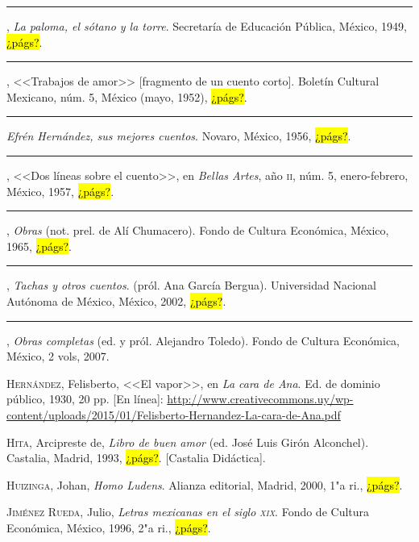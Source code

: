 \documentclass[14pt,twoside,final]{extbook} %
\begin{document}
\rule{1cm}{0.4pt}, \emph{La paloma, el sótano y la torre}. Secretaría de Educación Pública, México, 1949, \hl{¿págs?}.\label{bib:hernandez1949}

\rule{1cm}{0.4pt}, <<Trabajos de amor>> [fragmento de un cuento corto]. Boletín Cultural Mexicano, núm. 5, México (mayo, 1952), \hl{¿págs?}.\label{bib:hernandez1952}

\rule{1cm}{0.4pt} \emph{Efrén Hernández, sus mejores cuentos}. Novaro, México, 1956, \hl{¿págs?}.\label{bib:hernandez1956}

\rule{1cm}{0.4pt}, <<Dos líneas sobre el cuento>>, en \emph{Bellas Artes}, año \textsc{ii}, núm. 5, enero-febrero, México, 1957, \hl{¿págs?}.\label{bib:hernandez1957}

\rule{1cm}{0.4pt}, \emph{Obras} (not. prel. de Alí Chumacero). Fondo de Cultura Económica, México, 1965, \hl{¿págs?}.\label{bib:hernandez1965}

\rule{1cm}{0.4pt}, \emph{Tachas y otros cuentos}. (pról. Ana García Bergua). Universidad Nacional Autónoma de México, México, 2002, \hl{¿págs?}.\label{bib:hernandez2002}

\rule{1cm}{0.4pt}, \emph{Obras completas} (ed. y pról. Alejandro Toledo). Fondo de Cultura Económica, México, 2 vols, 2007.\label{bib:hernandez2007}

\textsc{Hernández}, Felisberto, <<El vapor>>, en \emph{La cara de Ana}. Ed. de dominio público, 1930, 20 pp. [En línea]: \url{http://www.creativecommons.uy/wp-content/uploads/2015/01/Felisberto-Hernandez-La-cara-de-Ana.pdf}

\textsc{Hita}, Arcipreste de, \emph{Libro de buen amor} (ed. José Luis Girón Alconchel). Castalia, Madrid, 1993, \hl{¿págs?}. [Castalia Didáctica].\label{bib:hita1993}

\textsc{Huizinga}, Johan, \emph{Homo Ludens}. Alianza editorial, Madrid, 2000, 1"a ri., \hl{¿págs?}.\label{bib:huizinga2000}

\textsc{Jiménez Rueda}, Julio, \emph{Letras mexicanas en el siglo \textsc{xix}}. Fondo de Cultura Económica, México, 1996, 2"a ri., \hl{¿págs?}.\label{bib:jimenez1996}
\end{document}
